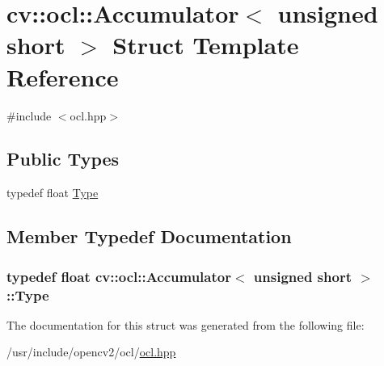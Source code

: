 \hypertarget{structcv_1_1ocl_1_1Accumulator_3_01unsigned_01short_01_4}{\section{cv\-:\-:ocl\-:\-:Accumulator$<$ unsigned short $>$ Struct Template Reference}
\label{structcv_1_1ocl_1_1Accumulator_3_01unsigned_01short_01_4}
}


{\ttfamily \#include $<$ocl.\-hpp$>$}

\subsection*{Public Types}
\begin{DoxyCompactItemize}
\item 
typedef float \hyperlink{structcv_1_1ocl_1_1Accumulator_3_01unsigned_01short_01_4_aa635d89d389164a39feccf75d221d251}{Type}
\end{DoxyCompactItemize}


\subsection{Member Typedef Documentation}
\hypertarget{structcv_1_1ocl_1_1Accumulator_3_01unsigned_01short_01_4_aa635d89d389164a39feccf75d221d251}{
\subsubsection[{Type}]{\setlength{\rightskip}{0pt plus 5cm}typedef float {\bf cv\-::ocl\-::\-Accumulator}$<$ unsigned short $>$\-::{\bf Type}}}\label{structcv_1_1ocl_1_1Accumulator_3_01unsigned_01short_01_4_aa635d89d389164a39feccf75d221d251}


The documentation for this struct was generated from the following file\-:\begin{DoxyCompactItemize}
\item 
/usr/include/opencv2/ocl/\hyperlink{ocl_2ocl_8hpp}{ocl.\-hpp}\end{DoxyCompactItemize}
